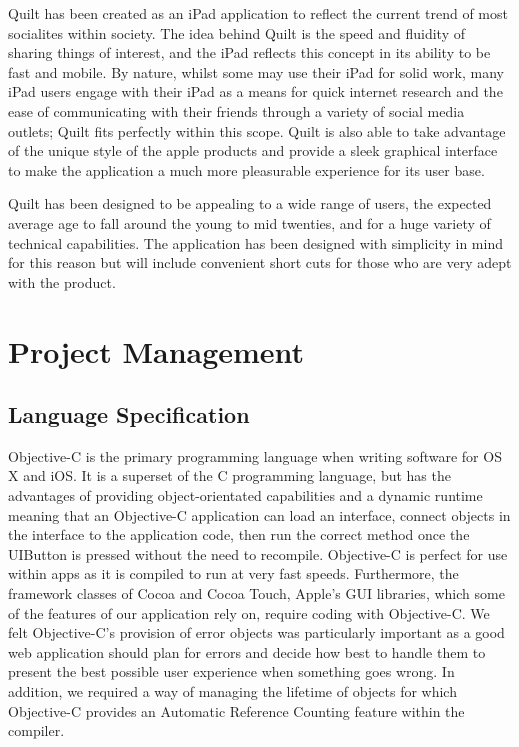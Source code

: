 \documentclass[a4wide, 10pt]{article}
\begin{document}
Quilt has been created as an iPad application to reflect the current trend of most socialites within society. The idea behind Quilt is the speed and fluidity of sharing things of interest, and the iPad reflects this concept in its ability to be fast and mobile. By nature, whilst some may use their iPad for solid work, many iPad users engage with their iPad as a means for quick internet research and the ease of communicating with their friends through a variety of social media outlets; Quilt fits perfectly within this scope. Quilt is also able to take advantage of the unique style of the apple products and provide a sleek graphical interface to make the application a much more pleasurable experience for its user base.

Quilt has been designed to be appealing to a wide range of users, the expected average age to fall around the young to mid twenties, and for a huge variety of technical capabilities. The application has been designed with simplicity in mind for this reason but will include convenient short cuts for those who are very adept with the product.
 

\section{Project Management}

\subsection{Language Specification}
Objective-C is the primary programming language when writing software for OS X and iOS. It is a superset of the C programming language, but has the advantages of providing object-orientated capabilities and a dynamic runtime meaning that an Objective-C application can load an interface, connect objects in the interface to the application code, then run the correct method once the UIButton is pressed without the need to recompile. Objective-C is perfect for use within apps as it is compiled to run at very fast speeds. Furthermore, the framework classes of Cocoa and Cocoa Touch, Apple's GUI libraries, which some of the features of our application rely on, require coding with Objective-C. We felt Objective-C's provision of error objects was particularly important as a good web application should plan for errors and decide how best to handle them to present the best possible user experience when something goes wrong. In addition, we required a way of managing the lifetime of objects for which Objective-C provides an Automatic Reference Counting feature within the compiler.
\end{document}

